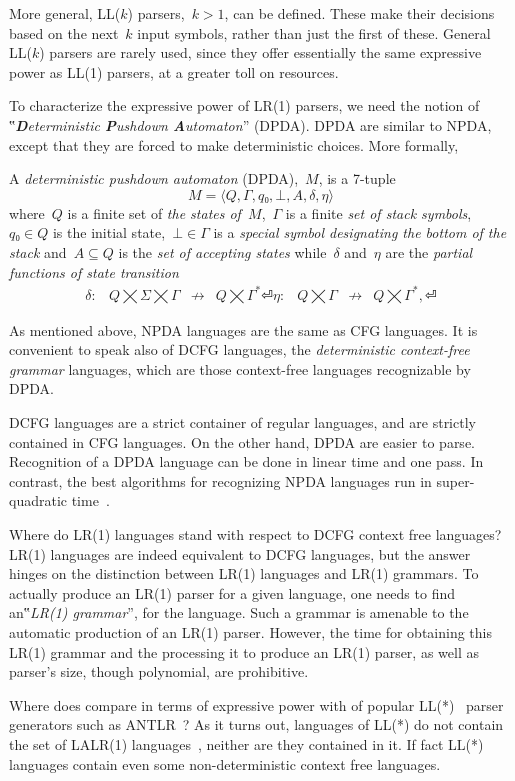 More general, LL($k$) parsers,~$k>1$, can be defined. These make their
  decisions based on the next~$k$ input symbols, rather than just the first of these.
  General LL($k$) parsers are rarely used, since they offer essentially 
    the same expressive power as LL(1) parsers, at a greater toll on resources.

To characterize the expressive power of LR(1) parsers, we need the notion
of ‟\emph{\textbf Deterministic \textbf Pushdown \textbf Automaton}” (DPDA).
DPDA are similar to NPDA, except that they are forced
  to make deterministic choices.
More formally,
\begin{Definition}
  \label{Definition:DPDA}
  A \emph{deterministic pushdown automaton} (DPDA),~$M$, is a 7-tuple
  \[
    M =⟨Q,Γ, q₀,⊥, A,δ,η⟩
  \]
  where~$Q$ is a finite set of
  \emph{the states of~$M$},~$Γ$ is a finite
  \emph{set of stack symbols},~$q₀∈Q$ is the initial state,~$⊥∈Γ$
  is a \emph{special symbol designating the bottom of the stack}
  and~$A⊆Q$ is the \emph{set of accepting states} while~$δ$ and~$η$ are
  the \emph{partial functions of state transition}
  \[
    \begin{array}{crlc}
      δ: & Q⨉Σ⨉Γ &↛& Q⨉Γ^*⏎
      η: & Q⨉Γ &↛& Q⨉Γ^*,⏎
    \end{array}
  \]
\end{Definition}

As mentioned above, NPDA languages are the same as CFG languages.
It is convenient to speak also of DCFG languages, the \emph{deterministic context-free grammar} languages,
  which are those context-free languages recognizable by DPDA.

DCFG languages are a strict container of regular languages, 
  and are strictly contained in CFG languages.
  On the other hand, DPDA are easier to parse. 
  Recognition of a DPDA language
  can be done in linear time and one pass.
  In contrast, the best algorithms for recognizing NPDA languages run in super-quadratic time~\cite{CYK,I forget the nnames}.

Where do LR(1) languages stand with respect to DCFG context free languages?
LR(1) languages are indeed equivalent to DCFG languages, but
the answer hinges on the distinction
  between LR(1) languages and LR(1) grammars.
To actually produce an LR(1) parser for a given language,
  one needs to find an‟\emph{LR(1) grammar}”, for the language.
Such a grammar is amenable to
  the automatic production of an LR(1) parser.
However, the time for obtaining this LR(1) grammar and the processing it to produce an LR(1) parser,
  as well as parser's size,
  though polynomial, are prohibitive.

Where does \Self compare in terms of expressive power with of popular LL(*)~\cite{Parr:2011-is this where it was introduced? I doubt it was so soon} parser generators such
  as ANTLR~\cite{ANTLR}?
  As it turns out, languages of LL(*) do not contain the set of LALR(1) languages~\cite{Tomer check this},
neither are they contained in it. If fact LL(*) languages
  contain even some non-deterministic context free languages.
